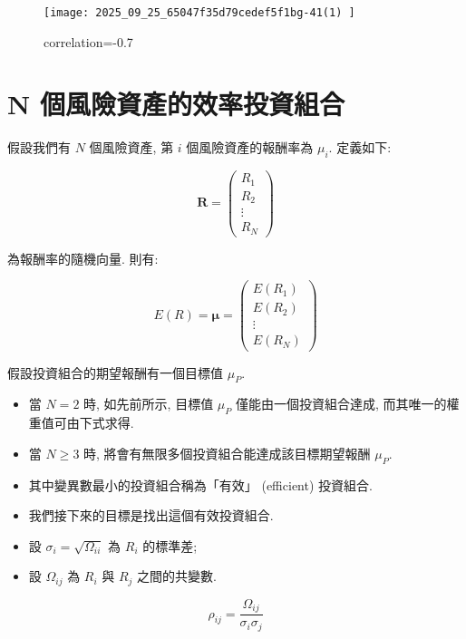 \documentclass[letterpaper]{article}
\begin{document}
		\begin{figure}[h]
			\begin{center}
				\caption{correlation=-0.7}
				\texttt{[image: 2025\_09\_25\_65047f35d79cedef5f1bg-41(1) ]}
			\end{center}
		\end{figure}
		
		\section{N 個風險資產的效率投資組合}
		假設我們有 $N$ 個風險資產, 第 $i$ 個風險資產的報酬率為 $\mu_{i}$. 定義如下: 
		
		
		$$
		\mathbf{R}=\left (\begin{array}{c}
			R_{1} \\
			R_{2} \\
			\vdots \\
			R_{N}
		\end{array}\right) 
		$$
		
		為報酬率的隨機向量. 則有: 
		
		$$
		E (R) =\boldsymbol{\mu}=\left (\begin{array}{c}
			E\left (R_{1}\right) \\
			E\left (R_{2}\right) \\
			\vdots \\
			E\left (R_{N}\right) 
		\end{array}\right) 
		$$
		
		假設投資組合的期望報酬有一個目標值 $\mu_{P}$. 
		
		\begin{itemize}
			\item 當 $N = 2$ 時, 如先前所示, 目標值 $\mu_{P}$ 僅能由一個投資組合達成, 而其唯一的權重值可由下式求得. 
			\item 當 $N \geq 3$ 時, 將會有無限多個投資組合能達成該目標期望報酬 $\mu_{P}$. 
			\item 其中變異數最小的投資組合稱為「有效」 (efficient) 投資組合. 
			\item 我們接下來的目標是找出這個有效投資組合. 
			
			\item 設 $\sigma_{i} = \sqrt{\Omega_{ii}}$ 為 $R_{i}$ 的標準差; 
			\item 設 $\Omega_{ij}$ 為 $R_{i}$ 與 $R_{j}$ 之間的共變數. 
		\end{itemize}
		
		$$
		\rho_{i j}=\frac{\Omega_{i j}}{\sigma_{i} \sigma_{j}}
		$$
		
\end{document}
